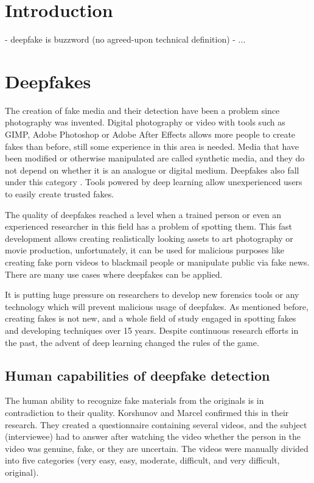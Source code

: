 \chapter{Introduction}

- deepfake is buzzword (no agreed-upon technical definition)
- ...

\chapter{Deepfakes}

The creation of fake media and their detection have been a problem since photography was invented. Digital photography or video with tools such as GIMP, Adobe Photoshop or Adobe After Effects allows more people to create fakes than before, still some experience in this area is needed. Media that have been modified or otherwise manipulated are called synthetic media, and they do not depend on whether it is an analogue or digital medium. Deepfakes also fall under this category \cite{IncreasingThreatofDeepfakeIdentites}. Tools powered by deep learning allow unexperienced users to easily create trusted fakes. 

The quality of deepfakes reached a level when a trained person or even an experienced researcher in this field has a problem of spotting them. This fast development allows creating realistically looking assets to art photography or movie production, unfortunately, it can be used for malicious purposes like creating fake porn videos to blackmail people or manipulate public via fake news. There are many use cases where deepfakes can be applied.

It is putting huge pressure on researchers to develop new forensics tools or any technology which will prevent malicious usage of deepfakes. As mentioned before, creating fakes is not new, and a whole field of study engaged in spotting fakes and developing techniques over 15 years. Despite continuous research efforts in the past, the advent of deep learning changed the rules of the game. \cite{MediaForensicsandDeepFakes}

\section{Human capabilities of deepfake detection}

The human ability to recognize fake materials from the originals is in contradiction to their quality. Korshunov and Marcel confirmed this in their research. They created a questionnaire containing several videos, and the subject (interviewee) had to answer after watching the video whether the person in the video was genuine, fake, or they are uncertain. The videos were manually divided into five categories (very easy, easy, moderate, difficult, and very difficult, original). 

